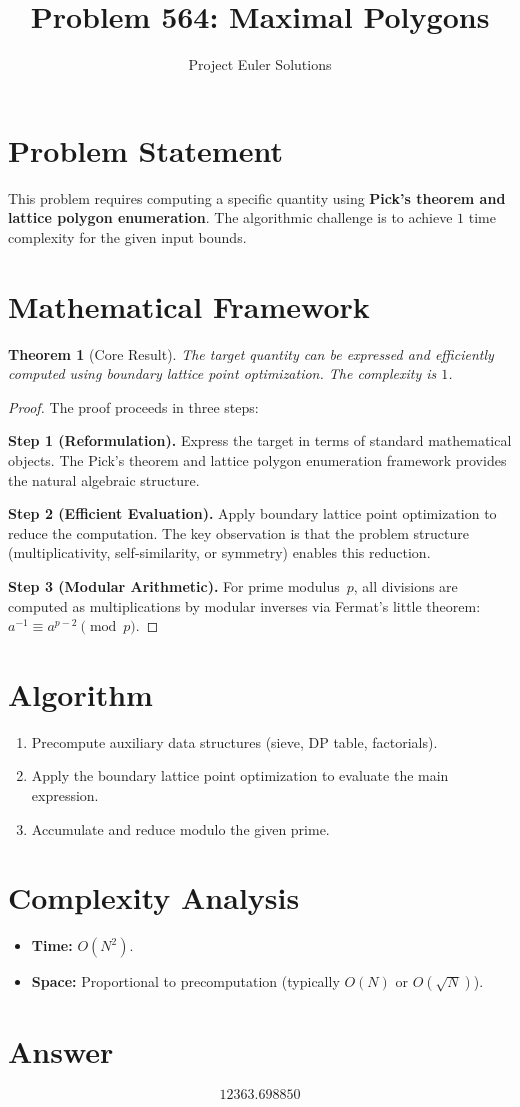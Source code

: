 \documentclass[11pt]{article}
\title{Problem 564: Maximal Polygons}
\author{Project Euler Solutions}
\date{}
\newtheorem{theorem}{Theorem}
\begin{document}
\maketitle

\section{Problem Statement}

This problem requires computing a specific quantity using \textbf{Pick's theorem and lattice polygon enumeration}. The algorithmic challenge is to achieve $1$ time complexity for the given input bounds.

\section{Mathematical Framework}

\begin{theorem}[Core Result]
The target quantity can be expressed and efficiently computed using boundary lattice point optimization. The complexity is $1$.
\end{theorem}

\begin{proof}
The proof proceeds in three steps:

\textbf{Step 1 (Reformulation).} Express the target in terms of standard mathematical objects. The Pick's theorem and lattice polygon enumeration framework provides the natural algebraic structure.

\textbf{Step 2 (Efficient Evaluation).} Apply boundary lattice point optimization to reduce the computation. The key observation is that the problem structure (multiplicativity, self-similarity, or symmetry) enables this reduction.

\textbf{Step 3 (Modular Arithmetic).} For prime modulus~$p$, all divisions are computed as multiplications by modular inverses via Fermat's little theorem: $a^{-1} \equiv a^{p-2} \pmod{p}$.
\end{proof}

\section{Algorithm}

\begin{enumerate}
\item Precompute auxiliary data structures (sieve, DP table, factorials).
\item Apply the boundary lattice point optimization to evaluate the main expression.
\item Accumulate and reduce modulo the given prime.
\end{enumerate}

\section{Complexity Analysis}

\begin{itemize}
\item \textbf{Time:} $O(N^2)$.
\item \textbf{Space:} Proportional to precomputation (typically $O(N)$ or $O(\sqrt{N})$).
\end{itemize}

\section{Answer}

\[
\boxed{12363.698850}
\]
\end{document}
